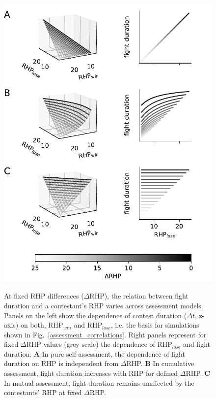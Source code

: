\documentclass[11pt,pdftex]{article}
\newcommand{\figitem}[1]{\textsf{\bfseries\uppercase{#1}}\penalty10000 }
\newcommand{\fref}[1]{\textup{\ref{#1}}}
\newcommand{\fig}{Fig.}
\newcommand{\figref}[1]{\fig~\fref{#1}}
\begin{document}
\begin{figure}[t]
  \begin{minipage}[t]{0.66\textwidth}
    \mbox{}\\
    \includegraphics[width=1\textwidth]{assessment_model_simulation}
  \end{minipage}\hfill
  \begin{minipage}[t]{0.3\textwidth}
    \caption{\label{assessment_sim} At fixed RHP differences ($\Delta$RHP), the relation between fight duration and a contestant's RHP varies across assessment models. Panels on the left show the dependence of contest duration ($\Delta t$, z-axis) on both, RHP$_{win}$ and RHP$_{lose}$, i.e. the basis for simulations shown in \figref{assessment_correlations}. Right panels represent for fixed $\Delta$RHP values (grey scale) the dependence of RHP$_{lose}$ and fight duration. \figitem{A} In pure self-assessment, the dependence of fight duration on RHP is independent from $\Delta$RHP. \figitem{B} In cumulative assessment, fight duration increases with RHP for defined $\Delta$RHP. \figitem{C} In mutual assessment, fight duration remains unaffected by the contestants' RHP at fixed $\Delta$RHP.}
  \end{minipage}
\end{figure}
\end{document}
